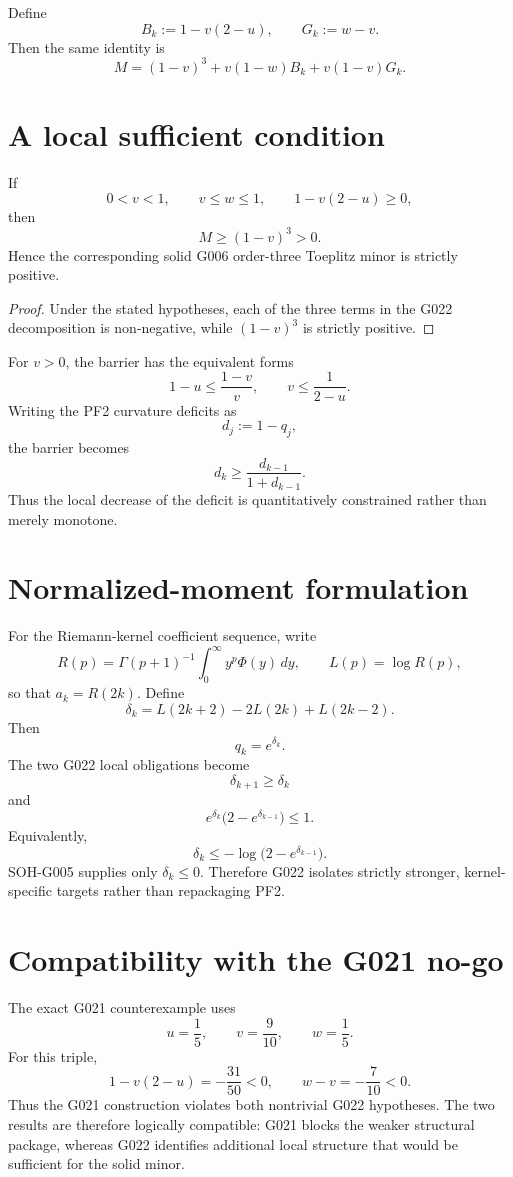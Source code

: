 Define
\[
 B_k:=1-v(2-u),
 \qquad
 G_k:=w-v.
\]
Then the same identity is
\[
 M=(1-v)^3+v(1-w)B_k+v(1-v)G_k.
\]

\section{A local sufficient condition}

\begin{corollary}
If
\[
 0<v<1,
 \qquad
 v\le w\le1,
 \qquad
 1-v(2-u)\ge0,
\]
then
\[
 \boxed{M\ge(1-v)^3>0.}
\]
Hence the corresponding solid G006 order-three Toeplitz minor is strictly
positive.
\end{corollary}

\begin{proof}
Under the stated hypotheses, each of the three terms in the G022
decomposition is non-negative, while \((1-v)^3\) is strictly positive.
\end{proof}

For \(v>0\), the barrier has the equivalent forms
\[
 1-u\le\frac{1-v}{v},
 \qquad
 v\le\frac{1}{2-u}.
\]
Writing the PF2 curvature deficits as
\[
 d_j:=1-q_j,
\]
the barrier becomes
\[
 \boxed{
 d_k\ge\frac{d_{k-1}}{1+d_{k-1}}.
 }
\]
Thus the local decrease of the deficit is quantitatively constrained rather
than merely monotone.

\section{Normalized-moment formulation}

For the Riemann-kernel coefficient sequence, write
\[
 R(p)=\Gamma(p+1)^{-1}\int_0^\infty y^p\Phi(y)\,dy,
 \qquad
 L(p)=\log R(p),
\]
so that \(a_k=R(2k)\). Define
\[
 \delta_k=L(2k+2)-2L(2k)+L(2k-2).
\]
Then
\[
 q_k=e^{\delta_k}.
\]
The two G022 local obligations become
\[
 \boxed{\delta_{k+1}\ge\delta_k}
\]
and
\[
 \boxed{
 e^{\delta_k}\bigl(2-e^{\delta_{k-1}}\bigr)\le1.
 }
\]
Equivalently,
\[
 \boxed{
 \delta_k\le-\log\!\bigl(2-e^{\delta_{k-1}}\bigr).
 }
\]
SOH-G005 supplies only \(\delta_k\le0\). Therefore G022 isolates strictly
stronger, kernel-specific targets rather than repackaging PF2.

\section{Compatibility with the G021 no-go}

The exact G021 counterexample uses
\[
 u=\frac15,
 \qquad
 v=\frac9{10},
 \qquad
 w=\frac15.
\]
For this triple,
\[
 1-v(2-u)=-\frac{31}{50}<0,
 \qquad
 w-v=-\frac7{10}<0.
\]
Thus the G021 construction violates both nontrivial G022 hypotheses. The two
results are therefore logically compatible: G021 blocks the weaker structural
package, whereas G022 identifies additional local structure that would be
sufficient for the solid minor.

